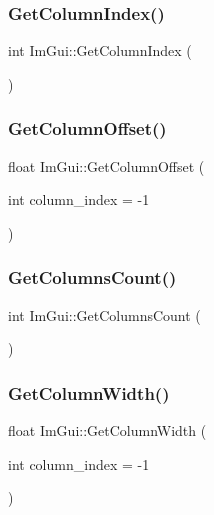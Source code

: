 \hypertarget{namespace_im_gui_acc31f8eea4fcfb86edeb3ac12d82fc05}{}\label{namespace_im_gui_acc31f8eea4fcfb86edeb3ac12d82fc05} 
\subsubsection{\texorpdfstring{Get\+Column\+Index()}{GetColumnIndex()}}
{\footnotesize\ttfamily int Im\+Gui\+::\+Get\+Column\+Index (\begin{DoxyParamCaption}{ }\end{DoxyParamCaption})}

\hypertarget{namespace_im_gui_a79c22e9c5c208b6c9534a273be71a9e6}{}\label{namespace_im_gui_a79c22e9c5c208b6c9534a273be71a9e6} 
\subsubsection{\texorpdfstring{Get\+Column\+Offset()}{GetColumnOffset()}}
{\footnotesize\ttfamily float Im\+Gui\+::\+Get\+Column\+Offset (\begin{DoxyParamCaption}\item[{int}]{column\+\_\+index = {\ttfamily -\/1} }\end{DoxyParamCaption})}

\hypertarget{namespace_im_gui_a3c2998ad9527948a4e4166c4f7db9ec9}{}\label{namespace_im_gui_a3c2998ad9527948a4e4166c4f7db9ec9} 
\subsubsection{\texorpdfstring{Get\+Columns\+Count()}{GetColumnsCount()}}
{\footnotesize\ttfamily int Im\+Gui\+::\+Get\+Columns\+Count (\begin{DoxyParamCaption}{ }\end{DoxyParamCaption})}

\hypertarget{namespace_im_gui_a3d205d86dab5ca0763a92997283ac36e}{}\label{namespace_im_gui_a3d205d86dab5ca0763a92997283ac36e} 
\subsubsection{\texorpdfstring{Get\+Column\+Width()}{GetColumnWidth()}}
{\footnotesize\ttfamily float Im\+Gui\+::\+Get\+Column\+Width (\begin{DoxyParamCaption}\item[{int}]{column\+\_\+index = {\ttfamily -\/1} }\end{DoxyParamCaption})}

